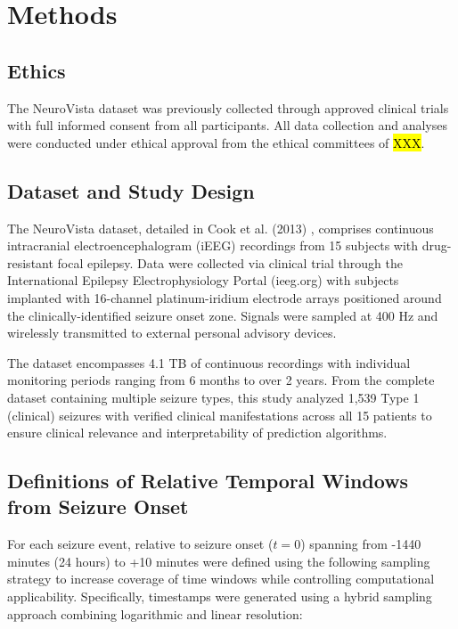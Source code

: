 

\section{Methods}

\subsection{Ethics}
The NeuroVista dataset was previously collected through approved clinical trials with full informed consent from all participants. All data collection and analyses were conducted under ethical approval from the ethical committees of \hl{XXX}. 

\subsection{Dataset and Study Design}
The NeuroVista dataset, detailed in Cook et al. (2013) , comprises continuous intracranial electroencephalogram (iEEG) recordings from 15 subjects with drug-resistant focal epilepsy. Data were collected via clinical trial through the International Epilepsy Electrophysiology Portal (ieeg.org) with subjects implanted with 16-channel platinum-iridium electrode arrays positioned around the clinically-identified seizure onset zone. Signals were sampled at 400 Hz and wirelessly transmitted to external personal advisory devices.

The dataset encompasses 4.1 TB of continuous recordings with individual monitoring periods ranging from 6 months to over 2 years. From the complete dataset containing multiple seizure types, this study analyzed 1,539 Type 1 (clinical) seizures with verified clinical manifestations across all 15 patients to ensure clinical relevance and interpretability of prediction algorithms.

\subsection{Definitions of Relative Temporal Windows from Seizure Onset}
For each seizure event, relative to seizure onset ($t = 0$) spanning from -1440 minutes (24 hours) to +10 minutes were defined using the following sampling strategy to increase coverage of time windows while controlling computational applicability. Specifically, timestamps were generated using a hybrid sampling approach combining logarithmic and linear resolution:

